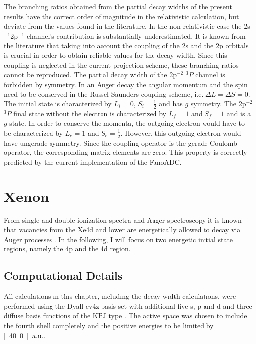 The branching ratios obtained from the partial decay widths of the present
results have the correct order of magnitude in the relativistic calculation, but
deviate from the values found in the literature. In the non-relativistic case
the 2s$^{-1}$2p$^{-1}$ channel's contribution is substantially underestimated.
It is known from the literature \cite{Aaberg82} that taking into account
the coupling of the 2s and the 2p orbitals is crucial in order to obtain
reliable values for the decay width. Since this coupling is neglected
in the current projection scheme, these branching ratios cannot be reproduced.
The partial decay width of the 2p$^{-2}$ $^3P$ channel is forbidden by symmetry.
In an Auger decay the angular momentum and the spin need to be conserved
in the Russel-Saunders coupling scheme, i.e. $\Delta L = \Delta S = 0$.
The initial state is characterized by $L_i = 0$, $S_i= \frac12$ and
has $g$ symmetry. The
2p$^{-2}$ $^3P$ final state without the electron is characterized by $L_f=1$
and $S_f = 1$ and is a $g$ state. In order to conserve the momenta, the
outgoing electron would have to be characterized by $L_e=1$ and $S_e=\frac12$.
However, this outgoing electron would have ungerade symmetry. Since the coupling
operator is the gerade Coulomb operator, the corresponding matrix elements
are zero.
This property is correctly predicted by the current implementation of the
FanoADC.




\section{Xenon}
From single and double ionization spectra and Auger spectroscopy
it is known that vacancies from the Xe4d and lower are energetically allowed to
decay via Auger processes \cite{Siegbahn69}.
In the following, I will focus on two energetic initial state regions, namely
the 4p and the 4d region.

\subsection{Computational Details}
All calculations in this chapter, including the decay width calculations,
were performed using the
Dyall cv4z basis set \cite{dyall5p06} with additional five s, p and d
and three diffuse basis functions                       
of the \ac{KBJ} type \cite{Kaufmann89}. The active space was chosen to include
the fourth shell completely and the positive energies to be limited by
\unit[40.0]{a.u.}.

